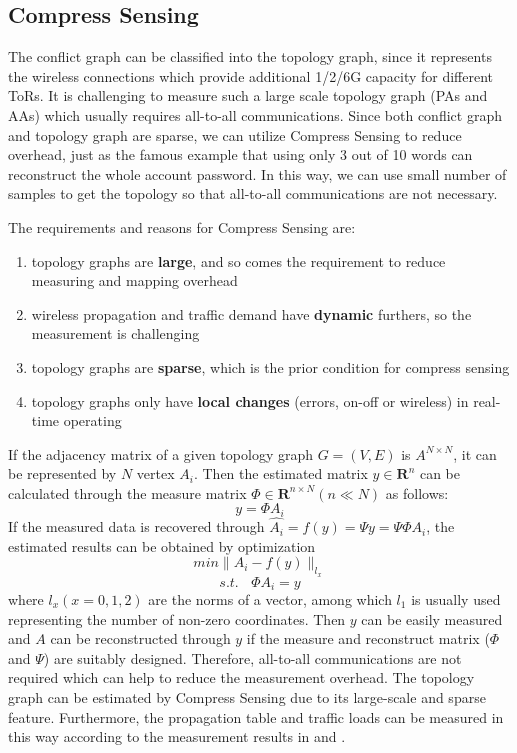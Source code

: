 \documentclass[journal,onecolumn,11pt]{IEEEtran}
\begin{document}
\subsection{Compress Sensing}

The conflict graph can be classified into the topology graph, since it represents the wireless connections which provide additional 1/2/6G capacity for different ToRs. It is challenging to measure such a large scale topology graph (PAs and AAs) which usually requires all-to-all communications. Since both conflict graph \cite{Halperin:2011:ADC:2018436.2018442} and topology graph \cite{Chen:2010:GAA:1851182.1851190} are sparse, we can utilize Compress Sensing to reduce overhead, just as the famous example that using only 3 out of 10 words can reconstruct the whole account password. In this way, we can use small number of samples to get the topology so that all-to-all communications are not necessary.

The requirements and reasons for Compress Sensing are:
\begin{enumerate}
  \item topology graphs are \textbf{large}, and so comes the requirement to reduce measuring and mapping overhead
  \item wireless propagation and traffic demand have \textbf{dynamic} furthers, so the measurement is challenging
  \item topology graphs are \textbf{sparse}, which is the prior condition for compress sensing
  \item topology graphs only have \textbf{local changes} (errors, on-off or wireless) in real-time operating
\end{enumerate}

If the adjacency matrix of a given topology graph $G=(V,E)$ is $A^{N\times N}$, it can be represented by $N$ vertex $A_i$. Then the estimated matrix $\hat{y}\in \textbf{R}^n$ can be calculated through the measure matrix $\Phi\in \textbf{R}^{n\times N} (n\ll N)$ as follows:
\begin{equation}
 y=\Phi A_i
 \label{estimation}
\end{equation}
If the measured data is recovered through $\hat{A_i}=f(y)=\Psi y=\Psi\Phi A_i$, the estimated results can be obtained by optimization
\begin{equation}
 min \parallel A_i-f(y) \parallel_{l_x}
 \label{recover1}
\end{equation}
\begin{equation}
 s.t.~~~~\Phi A_i = y
 \label{recover2}
\end{equation}
where $l_x (x=0,1,2)$ are the norms of a vector, among which $l_1$ is usually used representing the number of non-zero coordinates. Then $y$ can be easily measured and $A$ can be reconstructed through $y$ if the measure and reconstruct matrix ($\Phi$ and $\Psi$) are suitably designed. Therefore, all-to-all communications are not required which can help to reduce the measurement overhead. The topology graph can be estimated by Compress Sensing due to its large-scale and sparse feature. Furthermore, the propagation table and traffic loads can be measured in this way according to the measurement results in \cite{Halperin:2011:ADC:2018436.2018442} and \cite{Greenberg:2009:VSF:1592568.1592576}.
\end{document}
